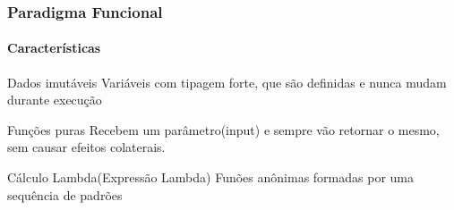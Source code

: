 \begin{frame}
    \frametitle{Paradigma Funcional}
    \framesubtitle{Características}

    \begin{block}{Dados imutáveis}
      Variáveis com tipagem forte, que são definidas e nunca mudam durante
      execução
    \end{block} \pause 

    \begin{block}{Funções puras}
      Recebem um parâmetro(input) e sempre vão retornar o mesmo, sem causar efeitos colaterais.
    \end{block} \pause 

    \begin{block}{Cálculo Lambda(Expressão Lambda)}
      Funões anônimas formadas por uma sequência de padrões
    \end{block} 
     
\end{frame}